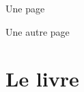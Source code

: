 \documentclass[openany]{book}
\begin{document}
\frontmatter

Une page

\newpage

Une autre page

\mainmatter
\part{Le livre}

\begin{pages}
  \begin{Leftside}
    \beginnumbering
    \pstart
    \lipsum[1]
    \pend
    \endnumbering
  \end{Leftside}
  \begin{Rightside}
    \beginnumbering
    \pstart
    \lipsum[1]
    \pend
    \endnumbering    
  \end{Rightside}
\end{pages}

\Pages
\end{document}

